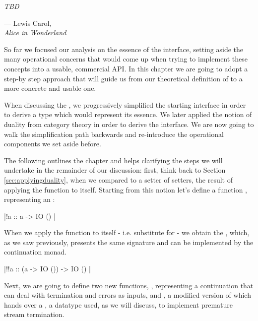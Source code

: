 \let\textcircled=\pgftextcircled
{}
\label{chap:outoftherabbithole}

\epigraph{\hspace{4ex}\textit{TBD}}{--- Lewis Carol,\\ \textit{Alice in Wonderland}}



So far we focused our analysis on the essence of the  interface, setting aside the many operational concerns that would come up when trying to implement these concepts into a usable, commercial API. In this chapter we are going to adopt a step-by step approach that will guide us from our theoretical definition of  to a more concrete and usable one.

When discussing the , we progressively simplified the starting interface in order to derive a type which would represent its essence. We later applied the notion of duality from category theory in order to derive the  interface. We are now going to walk the simplification path backwards and re-introduce the operational components  we set aside before.

The following outlines the chapter and helps clarifying the steps we will undertake in the remainder of our discussion: first, think back to Section \ref{sec:applyingduality}, when we compared  to a setter of setters, the result of applying the  function to itself. Starting from this notion let's define a function \code{(!)}, representing an :

\hmint |!a :: a -> IO () |

When we apply the function to itself - i.e. substitute  for  - we obtain the , which, as we saw previously, presents the same signature and can be implemented by the continuation monad.

\hmint |!!a :: (a -> IO ()) -> IO () |

Next, we are going to define two new functions, , representing a continuation that can deal with termination and errors as inputs, and \code{(\%)}, a modified version of \code{(!)} which hands over a , a datatype used, as we will discuss, to implement premature stream termination.

